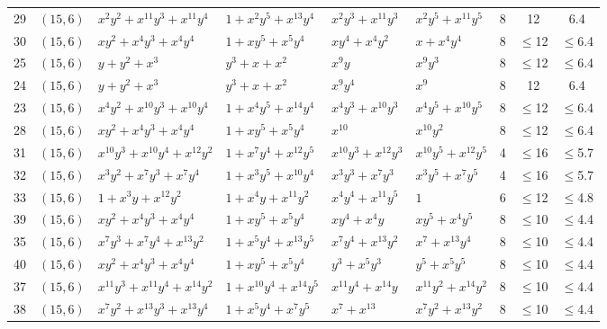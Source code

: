 \begin{table}[t]
\begin{tabular*}{\textwidth}{@{\extracolsep{\fill}}cllllllcc}
29 & $(15,6)$ & $x^{2}y^{2}{+}x^{11}y^{3}{+}x^{11}y^{4}$ & $1{+}x^{2}y^{5}{+}x^{13}y^{4}$ & $x^{2}y^{3}{+}x^{11}y^{3}$ & $x^{2}y^{5}{+}x^{11}y^{5}$ & 8 & 12 & 6.4 \\
30 & $(15,6)$ & $xy^{2}{+}x^{4}y^{3}{+}x^{4}y^{4}$ & $1{+}xy^{5}{+}x^{5}y^{4}$ & $xy^{4}{+}x^{4}y^{2}$ & $x{+}x^{4}y^{4}$ & 8 & $\leq$12 & $\leq$6.4 \\
25 & $(15,6)$ & $y{+}y^{2}{+}x^{3}$ & $y^{3}{+}x{+}x^{2}$ & $x^{9}y$ & $x^{9}y^{3}$ & 8 & $\leq$12 & $\leq$6.4 \\
24 & $(15,6)$ & $y{+}y^{2}{+}x^{3}$ & $y^{3}{+}x{+}x^{2}$ & $x^{9}y^{4}$ & $x^{9}$ & 8 & 12 & 6.4 \\
23 & $(15,6)$ & $x^{4}y^{2}{+}x^{10}y^{3}{+}x^{10}y^{4}$ & $1{+}x^{4}y^{5}{+}x^{14}y^{4}$ & $x^{4}y^{3}{+}x^{10}y^{3}$ & $x^{4}y^{5}{+}x^{10}y^{5}$ & 8 & $\leq$12 & $\leq$6.4 \\
28 & $(15,6)$ & $xy^{2}{+}x^{4}y^{3}{+}x^{4}y^{4}$ & $1{+}xy^{5}{+}x^{5}y^{4}$ & $x^{10}$ & $x^{10}y^{2}$ & 8 & $\leq$12 & $\leq$6.4 \\
31 & $(15,6)$ & $x^{10}y^{3}{+}x^{10}y^{4}{+}x^{12}y^{2}$ & $1{+}x^{7}y^{4}{+}x^{12}y^{5}$ & $x^{10}y^{3}{+}x^{12}y^{3}$ & $x^{10}y^{5}{+}x^{12}y^{5}$ & 4 & $\leq$16 & $\leq$5.7 \\
32 & $(15,6)$ & $x^{3}y^{2}{+}x^{7}y^{3}{+}x^{7}y^{4}$ & $1{+}x^{3}y^{5}{+}x^{10}y^{4}$ & $x^{3}y^{3}{+}x^{7}y^{3}$ & $x^{3}y^{5}{+}x^{7}y^{5}$ & 4 & $\leq$16 & $\leq$5.7 \\
33 & $(15,6)$ & $1{+}x^{3}y{+}x^{12}y^{2}$ & $1{+}x^{4}y{+}x^{11}y^{2}$ & $x^{4}y^{4}{+}x^{11}y^{5}$ & $1$ & 6 & $\leq$12 & $\leq$4.8 \\
39 & $(15,6)$ & $xy^{2}{+}x^{4}y^{3}{+}x^{4}y^{4}$ & $1{+}xy^{5}{+}x^{5}y^{4}$ & $xy^{4}{+}x^{4}y$ & $xy^{5}{+}x^{4}y^{5}$ & 8 & $\leq$10 & $\leq$4.4 \\
35 & $(15,6)$ & $x^{7}y^{3}{+}x^{7}y^{4}{+}x^{13}y^{2}$ & $1{+}x^{5}y^{4}{+}x^{13}y^{5}$ & $x^{7}y^{4}{+}x^{13}y^{2}$ & $x^{7}{+}x^{13}y^{4}$ & 8 & $\leq$10 & $\leq$4.4 \\
40 & $(15,6)$ & $xy^{2}{+}x^{4}y^{3}{+}x^{4}y^{4}$ & $1{+}xy^{5}{+}x^{5}y^{4}$ & $y^{3}{+}x^{5}y^{3}$ & $y^{5}{+}x^{5}y^{5}$ & 8 & $\leq$10 & $\leq$4.4 \\
37 & $(15,6)$ & $x^{11}y^{3}{+}x^{11}y^{4}{+}x^{14}y^{2}$ & $1{+}x^{10}y^{4}{+}x^{14}y^{5}$ & $x^{11}y^{4}{+}x^{14}y$ & $x^{11}y^{2}{+}x^{14}y^{2}$ & 8 & $\leq$10 & $\leq$4.4 \\
38 & $(15,6)$ & $x^{7}y^{2}{+}x^{13}y^{3}{+}x^{13}y^{4}$ & $1{+}x^{5}y^{4}{+}x^{7}y^{5}$ & $x^{7}{+}x^{13}$ & $x^{7}y^{2}{+}x^{13}y^{2}$ & 8 & $\leq$10 & $\leq$4.4 \\

\end{tabular*}
\end{table}
